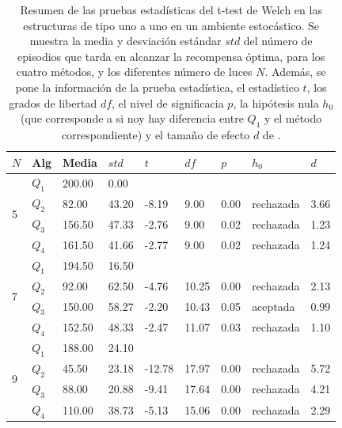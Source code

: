 \begin{table}[]
\centering
\caption{\footnotesize{Resumen de las pruebas estadísticas del t-test de Welch en las
estructuras de tipo uno a uno en un ambiente estocástico. Se muestra la media y desviación estándar $std$ del número 
de episodios que tarda en alcanzar la recompensa óptima, para los cuatro métodos, y los diferentes número de luces $N$. Además, se pone la información
de la prueba estadística, el estadístico $t$, los grados de libertad $df$, el nivel
de significacia $p$, la hipótesis nula $h_0$ (que corresponde a si noy hay diferencia entre $Q_1$ y el método correspondiente) y el tamaño de efecto $d$ de \citet{cohen2013statistical}.}}
\label{tab:dqn-one-to-one-sto}
\begin{tabular}{|l|l|l|l|l|l|l|l|l|}
\hline
$N$ & Alg & Media & $std$ & $t$ & $df$ & $p$ & $h_0$ & $d$ \\ \hline
\multirow{4}{*}{5} & $Q_1$ & 200.00 & 0.00 & \multicolumn{5}{l|}{} \\ \cline{2-9} 
 & $Q_2$ & 82.00 & 43.20 & -8.19 & 9.00 & 0.00 & rechazada & 3.66 \\ \cline{2-9} 
 & $Q_3$ & 156.50 & 47.33 & -2.76 & 9.00 & 0.02 & rechazada & 1.23 \\ \cline{2-9} 
 & $Q_4$ & 161.50 & 41.66 & -2.77 & 9.00 & 0.02 & rechazada & 1.24 \\ \hline
\multirow{4}{*}{7} & $Q_1$ & 194.50 & 16.50 & \multicolumn{5}{l|}{} \\ \cline{2-9} 
 & $Q_2$ & 92.00 & 62.50 & -4.76 & 10.25 & 0.00 & rechazada & 2.13 \\ \cline{2-9} 
 & $Q_3$ & 150.00 & 58.27 & -2.20 & 10.43 & 0.05 & aceptada & 0.99 \\ \cline{2-9} 
 & $Q_4$ & 152.50 & 48.33 & -2.47 & 11.07 & 0.03 & rechazada & 1.10 \\ \hline
\multirow{4}{*}{9} & $Q_1$ & 188.00 & 24.10 & \multicolumn{5}{l|}{} \\ \cline{2-9} 
 & $Q_2$ & 45.50 & 23.18 & -12.78 & 17.97 & 0.00 & rechazada & 5.72 \\ \cline{2-9} 
 & $Q_3$ & 88.00 & 20.88 & -9.41 & 17.64 & 0.00 & rechazada & 4.21 \\ \cline{2-9} 
 & $Q_4$ & 110.00 & 38.73 & -5.13 & 15.06 & 0.00 & rechazada & 2.29 \\ \hline
\end{tabular}
\end{table}

